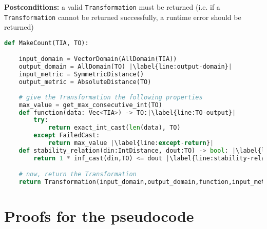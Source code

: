 \documentclass[12pt,letterpaper]{article}
\theoremstyle{definition}
\begin{document}
\textbf{Postconditions:} a valid \texttt{Transformation} must be returned (i.e. if a \texttt{Transformation} cannot be returned successfully, a runtime error should be returned)

\begin{lstlisting}[language = Python, escapechar=|]
def MakeCount(TIA, TO):

    input_domain = VectorDomain(AllDomain(TIA))
    output_domain = AllDomain(TO) |\label{line:output-domain}|
    input_metric = SymmetricDistance()
    output_metric = AbsoluteDistance(TO)
    
    # give the Transformation the following properties
    max_value = get_max_consecutive_int(TO) 
    def function(data: Vec<TIA>) -> TO:|\label{line:TO-output}|
        try:
            return exact_int_cast(len(data), TO)
        except FailedCast:
            return max_value |\label{line:except-return}|
    def stability_relation(din:IntDistance, dout:TO) -> bool: |\label{line:din-dout-type}|
        return 1 * inf_cast(din,TO) <= dout |\label{line:stability-relation}|

    # now, return the Transformation
    return Transformation(input_domain,output_domain,function,input_metric,output_metric,stability_relation)

\end{lstlisting}

\section{Proofs for the pseudocode}
\end{document}
